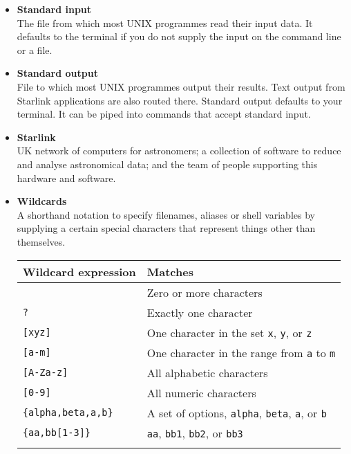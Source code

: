 \documentclass[twoside,11pt]{article}
\newcommand{\htmlref}[2]{#1}
\begin{document}
\begin{itemize}
\item {\bf\label{sc4_gl_std_inp}Standard input}\\
      The file from which most UNIX programmes read their input data.
      It defaults to the terminal if you do not supply the input on
      the command line or a file.

\item {\bf\label{sc4_gl_std_out}Standard output}\\
      File to which most UNIX programmes output their results.  Text
      output from Starlink applications are also routed there.
      Standard output defaults to your terminal.  It can be
      \htmlref{piped}{sc4_gl_pipe} into commands that accept
      \htmlref{standard input}{sc4_gl_std_inp}.

\item {\bf\label{sc4_gl_starlink}Starlink}\\
      UK network of computers for astronomers; a collection of
      software to reduce and analyse astronomical data; and the team
      of people supporting this hardware and software.

\item {\bf\label{sc4_gl_wild}Wildcards}\\
      A shorthand notation to specify filenames,
      \htmlref{aliases}{sc4_gl_alias} or \htmlref{shell
      variables}{sc4_gl_she_var} by supplying a certain special
      characters that represent things other than themselves.
      \medskip


      \begin{tabular}{lp{100mm}}
      Wildcard expression & Matches \\ \hline
      {\tt *} & Zero or more characters \\
      {\tt ?} & Exactly one character \\
      {\tt [xyz]} & One character in the set {\tt x}, {\tt y}, or {\tt z} \\
      {\tt [a-m]} & One character in the range from {\tt a} to {\tt m} \\
      {\tt [A-Za-z]} & All alphabetic characters \\
      {\tt [0-9]} & All numeric characters \\
      {\tt \{alpha,beta,a,b\}} & A set of options, {\tt alpha}, {\tt beta}, {\tt a}, or {\tt b} \\
      {\tt \{aa,bb[1-3]\}} & {\tt aa}, {\tt bb1}, {\tt bb2}, or {\tt bb3} \\
      \\ \hline
      \end{tabular}


\end{itemize}
\end{document}
